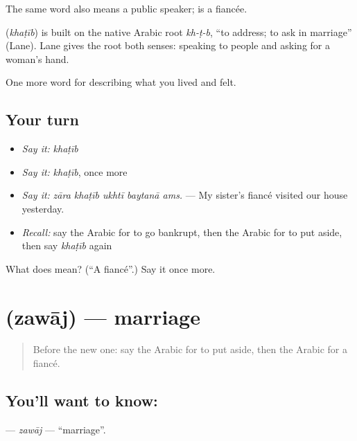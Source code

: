The same word also means a public speaker;  is a fiancée.

\begin{cousinweb}
\textbf{} (\emph{khaṭīb}) is built on the native Arabic root \emph{kh-ṭ-b}, \textquotedblleft{}to address; to ask in marriage\textquotedblright{} (Lane). Lane gives the root both senses: speaking to people and asking for a woman's hand.
\end{cousinweb}

\begin{grammarlens}[title={What you've built}]
One more word for describing what you lived and felt.
\end{grammarlens}

\subsection*{Your turn}
\begin{itemize}
\raggedright
  \item \emph{Say it:} \emph{khaṭīb}
  \item \emph{Say it:} \emph{khaṭīb}, once more
  \item \emph{Say it:} \emph{zāra khaṭīb ukhtī baytanā ams.} — My sister's fiancé visited our house yesterday.
  \item \emph{Recall:} say the Arabic for to go bankrupt, then the Arabic for to put aside, then say \emph{khaṭīb} again
\end{itemize}

\begin{tcolorbox}[breakable,colback=teal!4,colframe=teal!35!black,title={Before you move on}]
What does  mean? (\textquotedblleft{}A fiancé\textquotedblright{}.) Say it once more.
\end{tcolorbox}
\section[\texorpdfstring{\ar{زواج} (zawāj)}{زواج (zawāj)}]{ (zawāj) — marriage}

\label{lesson:AR-C528-zawaj}



\begin{quote}
Before the new one: say the Arabic for to put aside, then the Arabic for a fiancé.
\end{quote}

\subsection*{You'll want to know: }
\textbf{} — \emph{zawāj} — \textquotedblleft{}marriage\textquotedblright{}.

